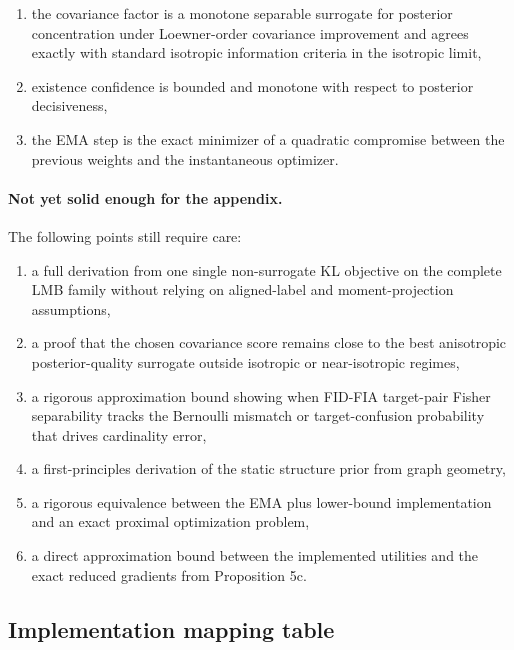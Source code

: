 \begin{enumerate}
 \item the covariance factor is a monotone separable surrogate for posterior concentration under Loewner-order covariance improvement and agrees exactly with standard isotropic information criteria in the isotropic limit,
 \item existence confidence is bounded and monotone with respect to posterior decisiveness,
 \item the EMA step is the exact minimizer of a quadratic compromise between the previous weights and the instantaneous optimizer.
\end{enumerate}

\paragraph{Not yet solid enough for the appendix.}
The following points still require care:
\begin{enumerate}
 \item a full derivation from one single non-surrogate KL objective on the complete LMB family without relying on aligned-label and moment-projection assumptions,
 \item a proof that the chosen covariance score remains close to the best anisotropic posterior-quality surrogate outside isotropic or near-isotropic regimes,
 \item a rigorous approximation bound showing when FID-FIA target-pair Fisher separability tracks the Bernoulli mismatch or target-confusion probability that drives cardinality error,
 \item a first-principles derivation of the static structure prior from graph geometry,
 \item a rigorous equivalence between the EMA plus lower-bound implementation and an exact proximal optimization problem,
 \item a direct approximation bound between the implemented utilities and the exact reduced gradients from Proposition 5c.
\end{enumerate}

\subsection*{Implementation mapping table}

